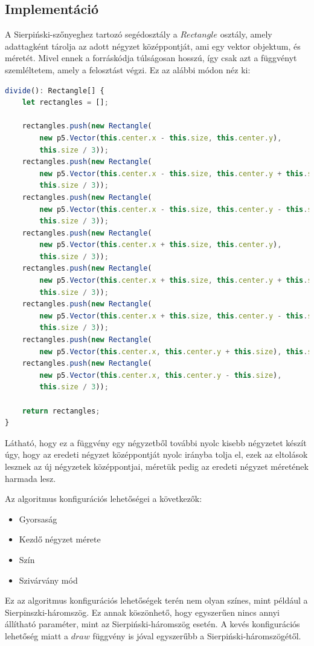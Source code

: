 \subsection*{Implementáció}
A Sierpiński-szőnyeghez tartozó segédosztály a $Rectangle$ osztály, amely adattagként tárolja az adott négyzet középpontját, ami egy vektor objektum, és méretét. Mivel ennek a forráskódja túlságosan hosszú, így csak azt a függvényt szemléltetem, amely a felosztást végzi. Ez az alábbi módon néz ki:
\begin{lstlisting}[language=typescript]
divide(): Rectangle[] {
	let rectangles = [];
	
	rectangles.push(new Rectangle(
		new p5.Vector(this.center.x - this.size, this.center.y), 
		this.size / 3));
	rectangles.push(new Rectangle(
		new p5.Vector(this.center.x - this.size, this.center.y + this.size), 
		this.size / 3));
	rectangles.push(new Rectangle(
		new p5.Vector(this.center.x - this.size, this.center.y - this.size), 
		this.size / 3));
	rectangles.push(new Rectangle(
		new p5.Vector(this.center.x + this.size, this.center.y), 
		this.size / 3));
	rectangles.push(new Rectangle(
		new p5.Vector(this.center.x + this.size, this.center.y + this.size), 
		this.size / 3));
	rectangles.push(new Rectangle(
		new p5.Vector(this.center.x + this.size, this.center.y - this.size), 
		this.size / 3));
	rectangles.push(new Rectangle(
		new p5.Vector(this.center.x, this.center.y + this.size), this.size / 3));
	rectangles.push(new Rectangle(
		new p5.Vector(this.center.x, this.center.y - this.size), 
		this.size / 3));
	
	return rectangles;
}
\end{lstlisting}
Látható, hogy ez a függvény egy négyzetből további nyolc kisebb négyzetet készít úgy, hogy az eredeti négyzet középpontját nyolc irányba tolja el, ezek az eltolások lesznek az új négyzetek középpontjai, méretük pedig az eredeti négyzet méretének harmada lesz.
\par Az algoritmus konfigurációs lehetőségei a következők:
\begin{itemize}
	\item Gyorsaság
	\item Kezdő négyzet mérete
	\item Szín
	\item Szivárvány mód
\end{itemize}
Ez az algoritmus konfigurációs lehetőségek terén nem olyan színes, mint például a Sierpinszki-háromszög. Ez annak köszönhető, hogy egyszerűen nincs annyi állítható paraméter, mint az Sierpiński-háromszög esetén. A kevés konfigurációs lehetőség miatt a $draw$ függvény is jóval egyszerűbb a Sierpiński-háromszögétől.
